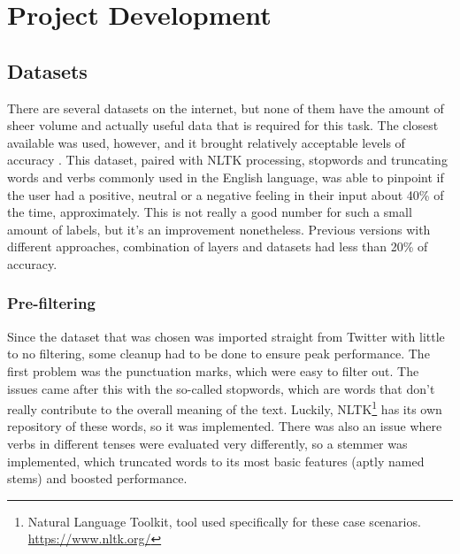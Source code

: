 \chapter{Project Development}

\section{Datasets}
There are several datasets on the internet, but none of them have the amount of sheer volume and actually useful data that is required for this task. The closest available was used, however, and it brought relatively acceptable levels of accuracy \citep{rf7}.
This dataset, paired with NLTK processing, stopwords and truncating words and verbs commonly used in the English language, was able to pinpoint if the user had a positive, neutral or a negative feeling in their input about 40\% of the time, approximately.
This is not really a good number for such a small amount of labels, but it's an improvement nonetheless. Previous versions with different approaches, combination of layers and datasets had less than 20\% of accuracy.
\pagebreak

\subsection{Pre-filtering}
Since the dataset that was chosen was imported straight from Twitter with little to no filtering, some cleanup had to be done to ensure peak performance.
The first problem was the punctuation marks, which were easy to filter out. The issues came after this with the so-called stopwords, which are words that don't really contribute to the overall meaning of the text. Luckily, NLTK\footnote{Natural Language Toolkit, tool used specifically for these case scenarios. \url{https://www.nltk.org/}} has its own repository of these words, so it was implemented. There was also an issue where verbs in different tenses were evaluated very differently, so a  stemmer was implemented, which truncated words to its most basic features (aptly named stems) and boosted performance.


